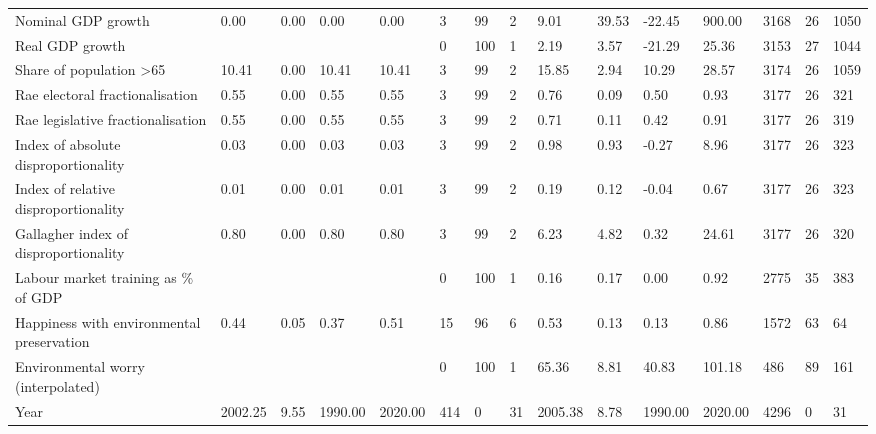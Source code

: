 \begin{longtable}{lllllllllllllll}
Nominal GDP growth & 0.00 & 0.00 & 0.00 & 0.00 & 3 & 99 & 2 & 9.01 & 39.53 & -22.45 & 900.00 & 3168 & 26 & 1050\\
Real GDP growth &  &  &  &  & 0 & 100 & 1 & 2.19 & 3.57 & -21.29 & 25.36 & 3153 & 27 & 1044\\
\addlinespace
Share of population >65 & 10.41 & 0.00 & 10.41 & 10.41 & 3 & 99 & 2 & 15.85 & 2.94 & 10.29 & 28.57 & 3174 & 26 & 1059\\
Rae electoral fractionalisation & 0.55 & 0.00 & 0.55 & 0.55 & 3 & 99 & 2 & 0.76 & 0.09 & 0.50 & 0.93 & 3177 & 26 & 321\\
Rae legislative fractionalisation & 0.55 & 0.00 & 0.55 & 0.55 & 3 & 99 & 2 & 0.71 & 0.11 & 0.42 & 0.91 & 3177 & 26 & 319\\
Index of absolute disproportionality & 0.03 & 0.00 & 0.03 & 0.03 & 3 & 99 & 2 & 0.98 & 0.93 & -0.27 & 8.96 & 3177 & 26 & 323\\
Index of relative disproportionality & 0.01 & 0.00 & 0.01 & 0.01 & 3 & 99 & 2 & 0.19 & 0.12 & -0.04 & 0.67 & 3177 & 26 & 323\\
\addlinespace
Gallagher index of disproportionality & 0.80 & 0.00 & 0.80 & 0.80 & 3 & 99 & 2 & 6.23 & 4.82 & 0.32 & 24.61 & 3177 & 26 & 320\\
Labour market training as \% of GDP &  &  &  &  & 0 & 100 & 1 & 0.16 & 0.17 & 0.00 & 0.92 & 2775 & 35 & 383\\
Happiness with environmental preservation & 0.44 & 0.05 & 0.37 & 0.51 & 15 & 96 & 6 & 0.53 & 0.13 & 0.13 & 0.86 & 1572 & 63 & 64\\
Environmental worry (interpolated) &  &  &  &  & 0 & 100 & 1 & 65.36 & 8.81 & 40.83 & 101.18 & 486 & 89 & 161\\
Year & 2002.25 & 9.55 & 1990.00 & 2020.00 & 414 & 0 & 31 & 2005.38 & 8.78 & 1990.00 & 2020.00 & 4296 & 0 & 31\\
\bottomrule
\end{longtable}
